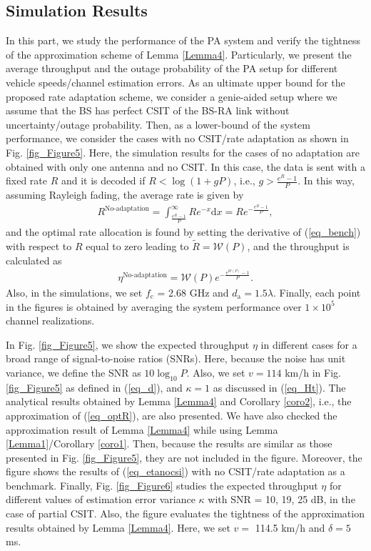 \subsection{Simulation Results}
In this part, we study the performance of the PA system and verify the tightness of the approximation scheme of Lemma \ref{Lemma4}. Particularly, we present the average throughput and the outage probability of the PA setup for different vehicle speeds/channel estimation errors. As an ultimate upper bound for the proposed rate adaptation scheme, we consider a genie-aided setup where we assume that the BS has perfect CSIT of the BS-RA link without uncertainty/outage probability. Then, as a lower-bound of the system performance, we consider the cases with no CSIT/rate adaptation as shown in Fig. \ref{fig_Figure5}. Here, the simulation results for the cases of no adaptation are obtained with only one antenna and no CSIT. In this case,  the data is sent with a fixed rate $R$ and it is decoded if $R<\log(1+gP)$, i.e., $g>\frac{e^{R}-1}{P}$. In this way, assuming Rayleigh fading, the average rate is given by
\begin{align}\label{eq_bench}
    R^{\text{No-adaptation}} = \int_{\frac{e^{R}-1}{P}}^{\infty} Re^{-x} \text{d}x = Re^{-\frac{e^{R}-1}{P}},
\end{align}
and the optimal rate allocation is found by setting the derivative of (\ref{eq_bench}) with respect to $R$ equal to zero leading to $\tilde{R} = \mathcal{W}(P)$, and the throughput is calculated as 
\begin{align}\label{eq_etanocsi}
  \eta^{\text{No-adaptation}} =\mathcal{W}(P)e^{-\frac{e^{\mathcal{W}(P)}-1}{P}}.  
\end{align}
Also, in the simulations, we set  $f_\text{c}$ = 2.68 GHz and $d_\text{a} = 1.5\lambda$. Finally, each point in the figures is obtained by averaging the system performance over $1\times10^5$ channel realizations.

In Fig. \ref{fig_Figure5}, we show the expected throughput $\eta$  in different cases for a broad range of signal-to-noise ratios (SNRs). Here, because the noise has unit variance, we define the SNR as $10\log_{10}P$. Also, we set $v = 114$ km/h in Fig. \ref{fig_Figure5}  as defined in (\ref{eq_d}), and $\kappa = 1$ as discussed in (\ref{eq_Ht}). The analytical results obtained by Lemma \ref{Lemma4} and Corollary \ref{coro2}, i.e., the approximation of (\ref{eq_optR}), are also presented. We have also checked the approximation result of Lemma \ref{Lemma4} while using Lemma \ref{Lemma1}/Corollary \ref{coro1}. Then, because the results are similar as those presented in Fig. \ref{fig_Figure5}, they are not included in the figure. Moreover, the figure shows the results of (\ref{eq_etanocsi}) with no CSIT/rate adaptation as a benchmark. Finally, Fig. \ref{fig_Figure6} studies the expected throughput $\eta$ for different values of estimation error variance $\kappa$ with SNR = 10, 19, 25 dB, in the case of partial CSIT. Also, the figure evaluates the tightness of the approximation results obtained by Lemma \ref{Lemma4}. Here,  we set $v =$ 114.5 km/h and $\delta = 5$ ms.

